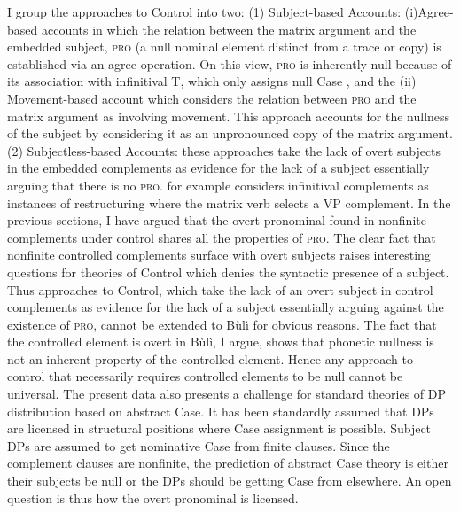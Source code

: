 \documentclass[output=paper,colorlinks,citecolor=brown]{langscibook}
\begin{document}
I group the approaches to Control into two: (1) Subject-based Accounts: (i)Agree-based accounts \citet{Landau2001, Landau2013} in which the relation between the matrix argument and the embedded subject, \textsc{pro} (a null nominal element distinct from a trace or copy) is established via an agree operation. On this view, \textsc{pro} is inherently null because of its association with infinitival T, which only assigns null Case \citep{ChomskyLasnik1993}, and the (ii) Movement-based account \citep{Hornstein1999} which considers the relation between \textsc{pro} and the matrix argument as involving movement. This approach accounts for the nullness of the subject by considering it as an unpronounced copy of the matrix argument. (2) Subjectless-based Accounts: these approaches take the lack of overt subjects in the embedded complements as evidence for the lack of a subject \citep{Bresnan1982, Dowty1985, JackendoffCulicover2003, Wurmbrand1998, Wurmbrand2004, Chierchia1989} essentially arguing that there is no \textsc{pro}. \citet{Wurmbrand1998, Wurmbrand2004} for example considers infinitival complements as instances of restructuring where the matrix verb selects a VP complement.  
In the previous sections, I have argued that the overt pronominal found in nonfinite complements under control shares all the properties of \textsc{pro}. The clear fact that nonfinite controlled complements surface with overt subjects raises interesting questions for theories of Control which denies the syntactic presence of a subject. Thus approaches to Control, which take the lack of an overt subject in control complements as evidence for the lack of a subject essentially arguing against the existence of \textsc{pro}, cannot be extended to Bùlì for obvious reasons. The fact that the controlled element is overt in Bùlì, I argue, shows that phonetic nullness is not an inherent property of the controlled element. Hence any approach to control that necessarily requires controlled elements to be null cannot be universal. 
The present data also presents a challenge for standard theories of DP  distribution based on abstract Case. It has been standardly assumed that DPs are licensed in structural positions where Case assignment is possible. Subject DPs are assumed to get nominative Case from  finite clauses. Since the complement clauses are nonfinite, the prediction of abstract Case theory is either their subjects be null or the DPs should be getting Case from elsewhere. An open question is thus how the overt pronominal is licensed.
\end{document}
